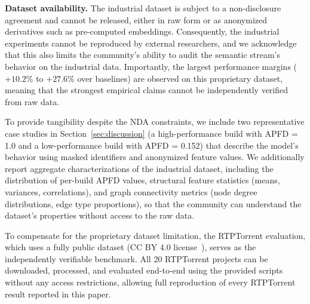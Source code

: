 \textbf{Dataset availability.} The industrial dataset is subject to a
non-disclosure agreement and cannot be released, either in raw form or as
anonymized derivatives such as pre-computed embeddings. Consequently, the
industrial experiments cannot be reproduced by external researchers, and we
acknowledge that this also limits the community's ability to audit the
semantic stream's behavior on the industrial data. Importantly,
the largest performance margins ($+10.2\%$ to $+27.6\%$ over baselines)
are observed on this proprietary dataset, meaning that the strongest
empirical claims cannot be independently verified from raw data.

To provide tangibility despite the NDA constraints, we include two
representative case studies in Section~\ref{sec:discussion} (a
high-performance build with APFD = 1.0 and a low-performance build with
APFD = 0.152) that describe the model's behavior using masked identifiers
and anonymized feature values. We additionally report aggregate
characterizations of the industrial dataset, including the distribution of
per-build APFD values, structural feature statistics (means, variances,
correlations), and graph connectivity metrics (node degree distributions,
edge type proportions), so that the community can understand the dataset's
properties without access to the raw data.

To compensate for the proprietary dataset limitation, the RTPTorrent
evaluation, which uses a fully public dataset (CC BY 4.0
license~\cite{mattis2020rtptorrent}), serves as the independently
verifiable benchmark. All 20 RTPTorrent projects can be downloaded,
processed, and evaluated end-to-end using the provided scripts without
any access restrictions, allowing full reproduction of every RTPTorrent
result reported in this paper.

